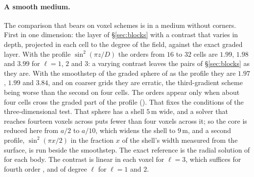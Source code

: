 \documentclass[11pt,a4paper]{article}
\begin{document}
\paragraph{A smooth medium.} The comparison that bears on voxel schemes is in a medium without corners.
First in one dimension: the layer of \S\ref{sec:blocks} with a contrast that varies in depth, projected
in each cell to the degree of the field, against the exact graded layer. With the profile
$\sin^2(\pi z/D)$ the orders from $16$ to $32$ cells are $1.99$, $1.98$ and $3.99$ for $\ell=1$, $2$
and $3$: a varying contrast leaves the pairs of \S\ref{sec:blocks} as they are. With the smoothstep of the graded sphere of
\citet{NestorError2026} as the profile they are $1.97$, $1.99$ and $3.84$, and on coarser grids they are
erratic, the third-gradient scheme being worse than the second on four cells. The orders appear only
when about four cells cross the graded part of the profile
(). That fixes the conditions of the
three-dimensional test. That sphere has a shell $5$\,m wide, and a solver
that reaches fourteen voxels across puts fewer than four voxels across it; so the core is reduced here
from $a/2$ to $a/10$, which widens the shell to $9$\,m, and a second profile, $\sin^2(\pi x/2)$ in the
fraction $x$ of the shell's width measured from the surface, is run beside the smoothstep. The exact
reference is the radial solution of \citet{NestorError2026} for each body. The contrast is linear in each
voxel for $\ell=3$, which suffices for fourth order \citep{NestorError2026}, and of degree $\ell$ for
$\ell=1$ and $2$.
\end{document}
